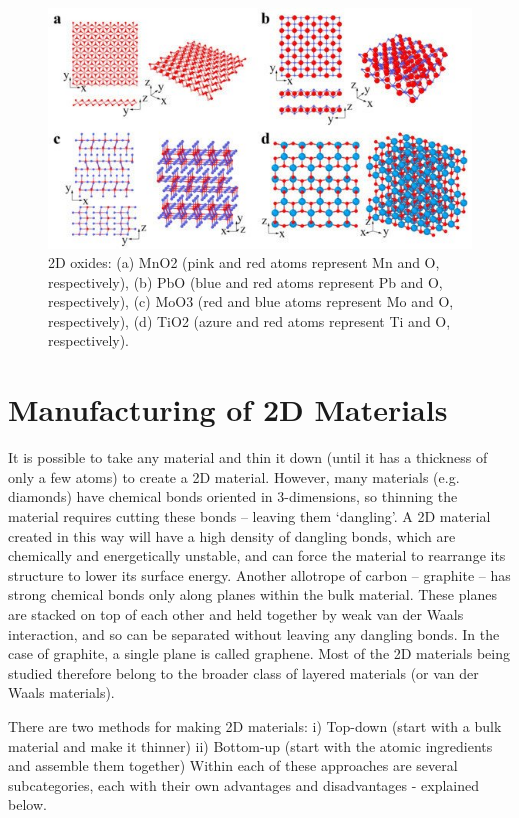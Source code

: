 \documentclass[12pt,a4paper]{report}
\begin{document}
\begin{itemize}
      \begin{figure}
        \centering
        \includegraphics[scale=0.3]{2.4.jpg}
        \caption{2D oxides: (a) MnO2 (pink and red atoms represent Mn and O, respectively), (b) PbO (blue and red atoms represent Pb and O, respectively), (c) MoO3 (red and blue atoms represent Mo and O, respectively), (d) TiO2 (azure and red atoms represent Ti and O, respectively).}
        \label{xotherfam}
        \end{figure}

\section{Manufacturing of 2D Materials}
It is possible to take any material and thin it down (until it has a thickness of only a few atoms) to create a 2D material. However, many materials (e.g. diamonds) have chemical bonds oriented in 3-dimensions, so thinning the material requires cutting these bonds – leaving them ‘dangling’. A 2D material created in this way will have a high density of dangling bonds, which are chemically and energetically unstable, and can force the material to rearrange its structure to lower its surface energy.
Another allotrope of carbon – graphite – has strong chemical bonds only along planes within the bulk material. These planes are stacked on top of each other and held together by weak van der Waals interaction, and so can be separated without leaving any dangling bonds. In the case of graphite, a single plane is called graphene. Most of the 2D materials being studied therefore belong to the broader class of layered materials (or van der Waals materials).

There are two methods for making 2D materials:
i) Top-down (start with a bulk material and make it thinner) 
ii) Bottom-up (start with the atomic ingredients and assemble them together)
Within each of these approaches are several subcategories, each with their own advantages and disadvantages - explained below.


\end{itemize}
\end{document}
